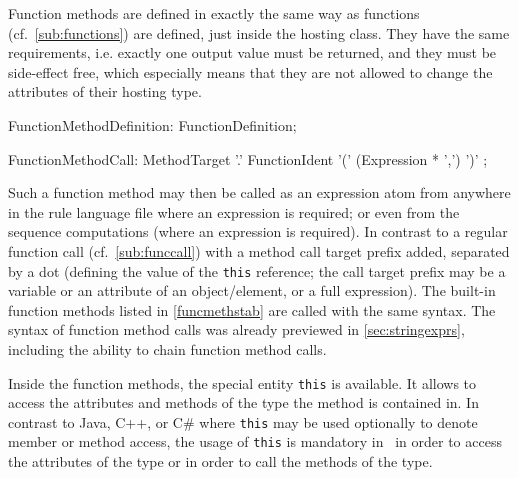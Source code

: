 Function methods are defined in exactly the same way as functions (cf.~\ref{sub:functions}) are defined, just inside the hosting class.
They have the same requirements, 
i.e. exactly one output value must be returned, 
and they must be side-effect free, which especially means that they are not allowed to change the attributes of their hosting type.

\begin{rail} 
  FunctionMethodDefinition: FunctionDefinition;
\end{rail}

\begin{rail}
  FunctionMethodCall: MethodTarget '.' FunctionIdent '(' (Expression * ',') ')' ;
\end{rail}

Such a function method may then be called as an expression atom from anywhere in the rule language file where an expression is required; or even from the sequence computations (where an expression is required).
In contrast to a regular function call (cf.~\ref{sub:funccall}) with a method call target prefix added, separated by a dot (defining the value of the \texttt{this} reference; the call target prefix may be a variable or an attribute of an object/element, or a full expression).
The built-in function methods listed in \ref{funcmethstab} are called with the same syntax.
The syntax of function method calls was already previewed in \ref{sec:stringexprs}, including the ability to chain function method calls.

Inside the function methods, the special entity \texttt{this} is available.
It allows to access the attributes and methods of the type the method is contained in.
In contrast to Java, C++, or C\# where \texttt{this} may be used optionally to denote member or method access,
the usage of \texttt{this} is mandatory in \GrG~in order to access the attributes of the type or in order to call the methods of the type.

